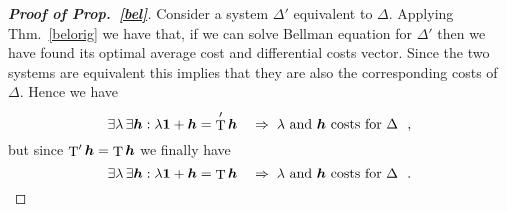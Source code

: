 \documentclass[11pt,a4paper]{article}
\DeclareMathOperator{\T}{T}
\DeclareMathOperator{\mf}{\enspace .}
\DeclareMathOperator{\mc}{\enspace ,}
\newcommand{\tone}{}
\newcommand{\ttwo}{'}
\theoremstyle{definition}
\theoremstyle{remark}
\def\vec#1{\mathchoice{\mbox{\boldmath$\displaystyle#1$}}
  {\mbox{\boldmath$\textstyle#1$}}
  {\mbox{\boldmath$\scriptstyle#1$}}
  {\mbox{\boldmath$\scriptscriptstyle#1$}}}
\begin{document}
\begin{proof}[{\bf Proof of Prop.~\ref{bel}}]
  Consider a system $\Delta\ttwo$ equivalent to $\Delta\tone$. Applying
  Thm.~\ref{belorig} we have that, if we can solve Bellman equation for
  $\Delta\ttwo$ then we have found its optimal average cost and differential
  costs vector. Since the two systems are equivalent this implies that they are
  also the corresponding costs of $\Delta\tone$. Hence we have
  \begin{equation}
    \exists \lambda \, \exists \vec h : \lambda\vec 1 + \vec h = \T\ttwo \vec h
    \quad \Rightarrow \; \text{$\lambda$ and $\vec h$ costs for }\Delta\tone \mc
  \end{equation}
  but since $\T\ttwo \vec h=\T\tone \vec h$ we finally have
  \begin{equation}
    \exists \lambda \, \exists \vec h : \lambda\vec 1 + \vec h = \T\tone \vec h
    \quad \Rightarrow \; \text{$\lambda$ and $\vec h$ costs for }\Delta\tone \mf
  \end{equation}
\end{proof}
\end{document}
